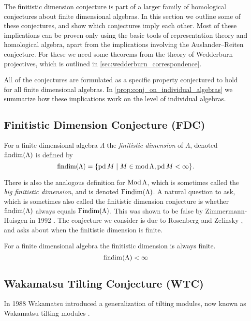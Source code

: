 
The finitistic dimension conjecture is part of a larger family of homological conjectures about finite dimensional algebras. In this section we outline some of these conjectures, and show which conjectures imply each other. Most of these implications can be proven only using the basic tools of representation theory and homological algebra, apart from the implications involving the Auslander--Reiten conjecture. For these we need some theorems from the theory of Wedderburn projectives, which is outlined in \cref{sec:wedderburn_correspondence}.

All of the conjectures are formulated as a specific property conjectured to hold for all finite dimensional algebras. In \cref{prop:conj_on_individual_algebras} we summarize how these implications work on the level of individual algebras.

\subsection*{Finitistic Dimension Conjecture (FDC)}
\begin{defn}
	For a finite dimensional algebra $\Lambda$ the \emph{finitistic dimension} of $\Lambda$, denoted $\operatorname{findim}(\Lambda)$ is defined by
	$$\operatorname{findim}(\Lambda) = \{\operatorname{pd} M \mid M \in \operatorname{mod}\Lambda, \operatorname{pd} M < \infty\}.$$
\end{defn}

There is also the analogous definition for $\operatorname{Mod}\Lambda$, which is sometimes called the \emph{big finitistic dimension}, and is denoted $\operatorname{Findim}(\Lambda)$. A natural question to ask, which is sometimes also called the finitistic dimension conjecture is whether $\operatorname{findim}(\Lambda)$ always equals $\operatorname{Findim}(\Lambda)$. This was shown to be false by Zimmermann-Huisgen in 1992 \cite{ZH92}. The conjecture we consider is due to Rosenberg and Zelinsky \cite{Bass60}, and asks about when the finitistic dimension is finite.

\begin{conj}
	For a finite dimensional algebra the finitistic dimension is always finite.
	$$\operatorname{findim}(\Lambda) < \infty$$
\end{conj}

\subsection*{Wakamatsu Tilting Conjecture (WTC)}
In 1988 Wakamatsu introduced a generalization of tilting modules, now known as Wakamatsu tilting modules \cite{Wak88}.

